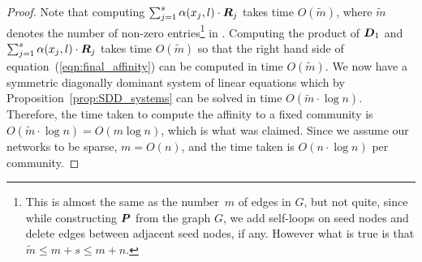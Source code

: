 \begin{proof}
Note that computing $\sum_{j = 1}^{s} \alpha (x_j, l) \cdot \boldsymbol{R}_j$ takes time $O(\tilde{m})$, where $\tilde{m}$ 
denotes the number of non-zero entries\footnote{This is almost the same as the 
number~$m$ of edges in $G$, but not quite, since while constructing $\boldsymbol{P}$ from the graph $G$, 
we add self-loops on seed nodes and delete edges between adjacent seed nodes, if any. However what is true is 
that $\tilde{m} \leq m + s \leq m + n$.} in . 
Computing the product of $\boldsymbol{D}_1$ and $\sum_{j = 1}^{s} \alpha (x_j, l) \cdot \boldsymbol{R}_j$ 
takes time $O(\tilde{m})$ so that the right hand side of equation~(\ref{eqn:final_affinity}) can 
be computed in time $O(\tilde{m})$. We now have a symmetric diagonally dominant system of linear equations 
which by Proposition~\ref{prop:SDD_systems} can be solved in time $O(\tilde{m} \cdot \log n)$. Therefore,
the time taken to compute the affinity to a fixed community is $O(\tilde{m} \cdot \log n) = O(m \log n)$,
which is what was claimed. Since we assume our networks to be sparse, $m = O(n)$, and 
the time taken is $O(n \cdot \log n)$ per community.  
%
\end{proof}

